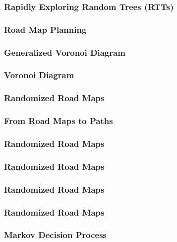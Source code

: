 \begin{frame}
	\frametitle{Rapidly Exploring Random Trees (RTTs)}
	
\end{frame}

\begin{frame}
	\frametitle{Road Map Planning}
	
\end{frame}


\begin{frame}
	\frametitle{Generalized Voronoi Diagram}
	
\end{frame}

\begin{frame}
	\frametitle{Voronoi Diagram}
	
\end{frame}

\begin{frame}
	\frametitle{Randomized Road Maps}
	
\end{frame}

\begin{frame}
	\frametitle{From Road Maps to Paths}
	
\end{frame}

\begin{frame}
	\frametitle{Randomized Road Maps}
	
\end{frame}

\begin{frame}
	\frametitle{Randomized Road Maps}
	
\end{frame}

\begin{frame}
	\frametitle{Randomized Road Maps}
	
\end{frame}

\begin{frame}
	\frametitle{Randomized Road Maps}
	
\end{frame}

\begin{frame}
	\frametitle{Markov Decision Process}
	
\end{frame}

